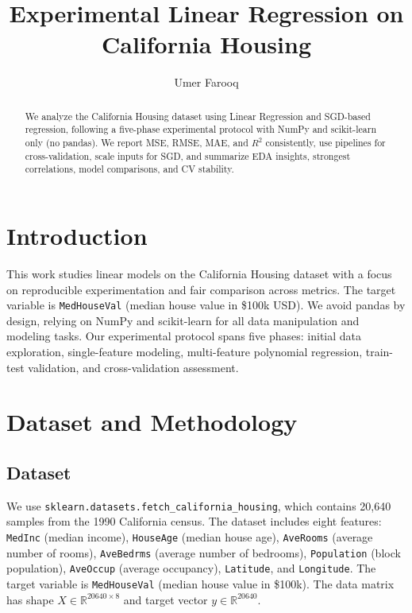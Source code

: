 \documentclass[runningheads]{llncs}
\begin{document}
\title{Experimental Linear Regression on California Housing}

\author{Umer Farooq}

\maketitle

\pagestyle{plain}

\renewcommand{\arraystretch}{1.3}
\setlength{\tabcolsep}{8pt}

\begin{abstract}
We analyze the California Housing dataset using Linear Regression and SGD-based regression, following a five-phase experimental protocol with NumPy and scikit-learn only (no pandas). We report MSE, RMSE, MAE, and $R^2$ consistently, use pipelines for cross-validation, scale inputs for SGD, and summarize EDA insights, strongest correlations, model comparisons, and CV stability.
\end{abstract}

\section{Introduction}
This work studies linear models on the California Housing dataset with a focus on reproducible experimentation and fair comparison across metrics. The target variable is \texttt{MedHouseVal} (median house value in \$100k USD). We avoid pandas by design, relying on NumPy and scikit-learn for all data manipulation and modeling tasks. Our experimental protocol spans five phases: initial data exploration, single-feature modeling, multi-feature polynomial regression, train-test validation, and cross-validation assessment.

\section{Dataset and Methodology}

\subsection{Dataset}
We use \texttt{sklearn.datasets.fetch\_california\_housing}, which contains 20,640 samples from the 1990 California census. The dataset includes eight features: \texttt{MedInc} (median income), \texttt{HouseAge} (median house age), \texttt{AveRooms} (average number of rooms), \texttt{AveBedrms} (average number of bedrooms), \texttt{Population} (block population), \texttt{AveOccup} (average occupancy), \texttt{Latitude}, and \texttt{Longitude}. The target variable is \texttt{MedHouseVal} (median house value in \$100k). The data matrix has shape $X \in \mathbb{R}^{20640 \times 8}$ and target vector $y \in \mathbb{R}^{20640}$.
\end{document}

